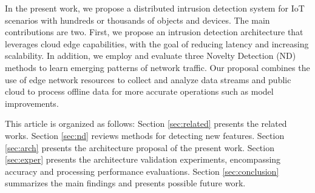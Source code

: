 In the present work, we propose a distributed intrusion detection system for IoT scenarios with hundreds or thousands of objects and devices. The main contributions are two. First, we propose an intrusion detection architecture that leverages cloud edge capabilities, with the goal of reducing latency and increasing scalability. In addition, we employ and evaluate three Novelty Detection (ND) methods to learn emerging patterns of network traffic. Our proposal combines the use of edge network resources to collect and analyze data streams and public  cloud to process offline data for more accurate operations such as model improvements.


This article is organized as follows: Section \ref{sec:related} presents the related works. Section \ref{sec:nd} reviews methods for detecting new features. Section \ref{sec:arch} presents the architecture proposal of the present work. Section \ref{sec:exper} presents the architecture validation experiments, encompassing accuracy and processing performance evaluations. Section \ref{sec:conclusion} summarizes the main findings and presents possible future work.














